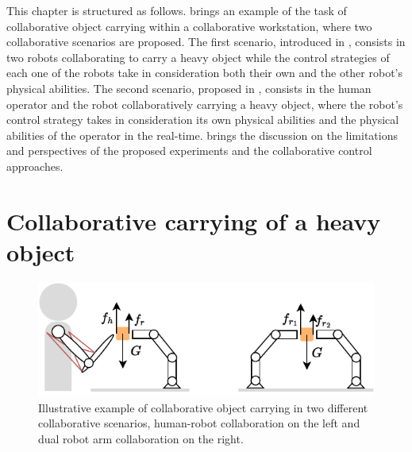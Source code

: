 
This chapter is structured as follows.  brings an example of the task of collaborative object carrying within a collaborative workstation, where two collaborative scenarios are proposed. The first scenario, introduced in , consists in two robots collaborating to carry a heavy object while the control strategies of each one of the robots take in consideration both their own and the other robot's physical abilities. The second scenario, proposed in , consists in the human operator and the robot collaboratively carrying a heavy object, where the robot's control strategy takes in consideration its own physical abilities and the physical abilities of the operator in the real-time.  brings the discussion on the limitations and perspectives of the proposed experiments and the collaborative control approaches.




\section{Collaborative carrying of a heavy object}
\label{ch:collaborative_carrying}

\begin{figure}[!h]
    \centering
    \includegraphics[width=0.8\linewidth]{Papers/images/carrying_schema.pdf}
    \caption{Illustrative example of collaborative object carrying in two different collaborative scenarios, human-robot collaboration on the left and dual robot arm collaboration on the right.}
    \label{fig:carrying_schema}
\end{figure}


